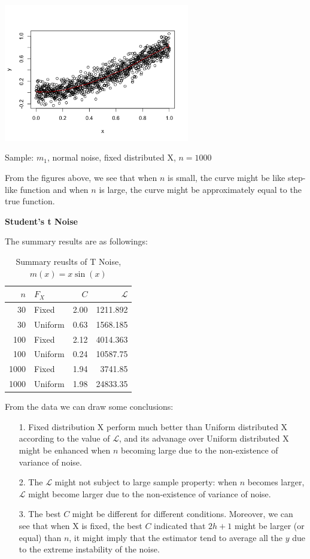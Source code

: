 \documentclass[twoside]{article}
\begin{document}
\begin{center}
\makeatletter
\def\@captype{figure}
\makeatother
\includegraphics [height=6cm]{code/m1_normal_1000_fixed.png}
\caption{Sample: $m_1$, normal noise, fixed distributed X, $n=1000$}
\label{m1_normal_1000_fixed}
\end{center}

From the figures above, we see that when $n$ is small, the curve might be like step-like function and when $n$ is large, the curve might be approximately equal to the true function.

\noindent \textbf{Student's t Noise}

The summary results are as followings:

\begin{table}[ht]
\centering
\caption{Summary reuslts of T Noise, $m(x)=x\sin(x)$}
\begin{tabular}{rlrr}
  \hline
  $n$ & $F_X$ & $C$ & $\mathcal{L}$ \\ 
  \hline
  30 & Fixed & 2.00 & 1211.892 \\ 
  30 & Uniform & 0.63 & 1568.185\\ 
  \hline
  100 & Fixed & 2.12 & 4014.363\\
  100 & Uniform & 0.24 & 10587.75\\
  \hline
  1000 & Fixed & 1.94 & 3741.85\\
  1000 & Uniform & 1.98 & 24833.35\\
  \hline
\end{tabular}
\label{cu}
\end{table}

From the data we can draw some conclusions:

\begin{itemize}
  \item[1.] Fixed distribution X perform much better than Uniform distributed X according to the value of $\mathcal{L}$, and its advanage over Uniform distributed X might be enhanced when $n$ becoming large due to the non-existence of variance of noise.
  \item[2.] The $\mathcal{L}$ might not subject to large sample property: when $n$ becomes larger, $\mathcal{L}$ might become larger due to the non-existence of variance of noise.
  \item[3.] The best $C$ might be different for different conditions. Moreover, we can see that when X is fixed, the best $C$ indicated that $2h+1$ might be larger (or equal) than $n$, it might imply that the estimator tend to average all the $y$ due to the extreme instability of the noise.
\end{itemize}
\end{document}

